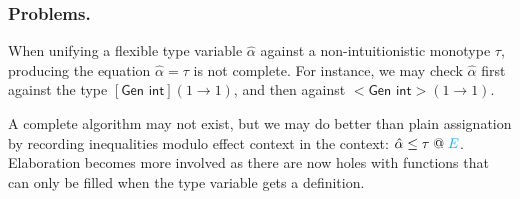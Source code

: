 \documentclass[a4paper,11pt]{article}
\makeatletter
\newcommand{\ectx}[1]{\;@\;{\color{cyan} #1}}
\makeatother
\begin{document}
\subsubsection{Problems.}
When unifying a flexible type variable $\hat{\alpha}$ against a
non-intuitionistic monotype $\tau$, producing the equation $\hat{\alpha}=\tau$
is not complete. For instance, we may check $\hat{\alpha}$ first against the
type $[\textsf{Gen int}](1\to1)$, and then against $<\textsf{Gen int}>(1\to1)$.

A complete algorithm may not exist, but we may do better than plain assignation
by recording inequalities modulo effect context in the context:
$\hat{\alpha}\leq \tau\ectx{E}$. Elaboration becomes more involved as there are
now holes with functions that can only be filled when the type variable gets a
definition.
\end{document}
